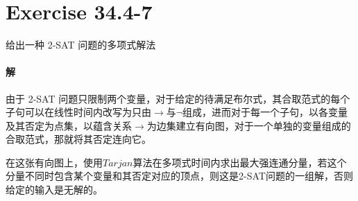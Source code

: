 \documentclass{article}
\begin{document}
\section{Exercise 34.4-7}
给出一种 2-SAT 问题的多项式解法
\paragraph{解}
由于 2-SAT 问题只限制两个变量，对于给定的待满足布尔式，其合取范式的每个子句可以在线性时间内改写为只由$\rightarrow$与$\lnot$组成，进而对于每一个子句，以各变量及其否定为点集，以蕴含关系$\rightarrow$为边集建立有向图，对于一个单独的变量组成的合取范式，那就将其否定连向它。\par
在这张有向图上，使用$Tarjan$算法在多项式时间内求出最大强连通分量，若这个分量不同时包含某个变量和其否定对应的顶点，则这是2-SAT问题的一组解，否则给定的输入是无解的。
\end{document}
